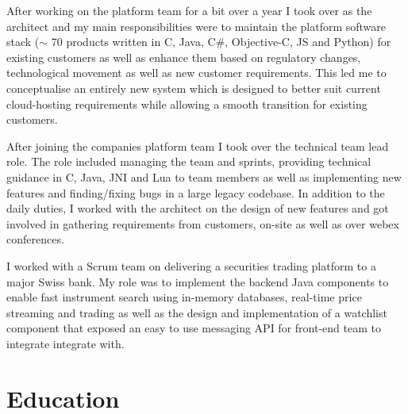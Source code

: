 \documentclass[11pt,a4paper]{my_cv}
\begin{document}
After working on the platform team for a bit over a year I took over as the architect and my main responsibilities were to maintain the platform software stack ($\sim$ 70 products written in C, Java, C\#, Objective-C, JS and Python) for existing customers as well as enhance them based on regulatory changes, technological movement as well as new customer requirements. This led me to conceptualise an entirely new system which is designed to better suit current cloud-hosting requirements while allowing a smooth transition for existing customers.

After joining the companies platform team I took over the technical team lead role. The role included managing the team and sprints, providing technical guidance in C, Java, JNI and Lua to team members as well as implementing new features and finding/fixing bugs in a large legacy codebase. In addition to the daily duties, I worked with the architect on the design of new features and got involved in gathering requirements from customers, on-site as well as over webex conferences.

I worked with a Scrum team on delivering a securities trading platform to a major Swiss bank. My role was to implement the backend Java components to enable fast instrument search using in-memory databases, real-time price streaming and trading as well as the design and implementation of a watchlist component that exposed an easy to use messaging API for front-end team to integrate integrate with.

\pagebreak
\section{Education}
\begin{projects}{10em}
\end{projects}
\begin{modules}
\end{modules}
\end{document}
